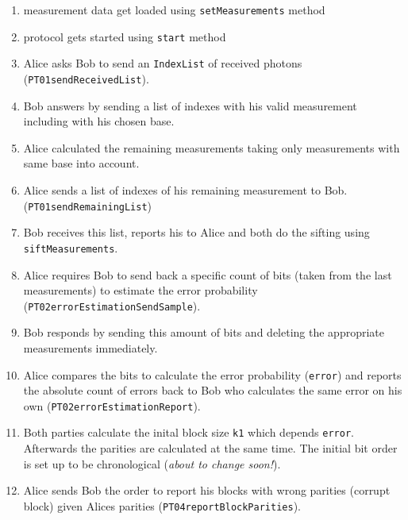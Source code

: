 \documentclass[a4paper,pdftex,DIV18,parskip=half+]{scrartcl}
\begin{document}
\begin{enumerate}
  \item measurement data get loaded using \texttt{setMeasurements} method
  \item protocol gets started using \texttt{start} method
  \item Alice asks Bob to send an \texttt{IndexList} of received photons (\texttt{PT01sendReceivedList}).
  \item Bob answers by sending a list of indexes with his valid measurement including with his chosen base.
  \item Alice calculated the remaining measurements taking only measurements with same base into account.
  \item Alice sends a list of indexes of his remaining measurement to Bob. (\texttt{PT01sendRemainingList})
  \item Bob receives this list, reports his to Alice and both do the sifting using \texttt{siftMeasurements}.
  \item Alice requires Bob to send back a specific count of bits (taken from the
        last measurements) to estimate the error probability (\texttt{PT02errorEstimationSendSample}).
  \item Bob responds by sending this amount of bits and deleting the appropriate
        measurements immediately.
  \item Alice compares the bits to calculate the error probability
        (\texttt{error}) and reports the absolute count of errors back to Bob
        who calculates the same error on his own (\texttt{PT02errorEstimationReport}).
  \item Both parties calculate the inital block size \texttt{k1} which depends
        \texttt{error}. Afterwards the parities are calculated at the same time.
        The initial bit order is set up to be chronological (\textit{about to change soon!}). 
  \item Alice sends Bob the order to report his blocks with wrong parities
        (corrupt block) given Alices parities (\texttt{PT04reportBlockParities}).
        

\end{enumerate}
\end{document}
